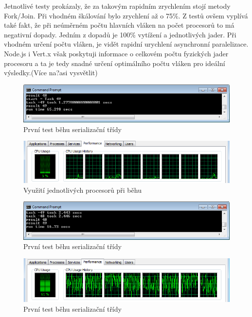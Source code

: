 Jetnotlivé testy prokázaly, že za takovým rapidním zrychlením stojí metody Fork/Join. Při vhodném škálování bylo zrychlení až o 75\%. Z testů ovšem vyplívá také fakt, že při neúměrném počtu hlavních vláken na počet procesorů to má negativní dopady. Jedním z dopadů je 100\% vytížení a jednotlivých jader. Při vhodném určení počtu vláken, je vidět rapidní urychlení asynchronní paralelizace. Node.js i Vert.x však poskytuji informace o celkovém počtu fyzických jader procesoru a ta je tedy snadné určení optimálního počtu vláken pro ideální výsledky.(Více na?asi vysvětlit)

\begin{figure}
\begin{centering}
\includegraphics[width=1\textwidth]{obrazky/serial_test_r1}
\par\end{centering}
\caption{První test běhu serializační třídy \label{fig:serialtestI}}
\end{figure}

\begin{figure}
\begin{centering}
\includegraphics[width=1\textwidth]{obrazky/serial_cpu_1}
\par\end{centering}
\caption{Využití jednotlivých procesorů při běhu \label{fig:serialCputestI}}
\end{figure}

\begin{figure}
\begin{centering}
\includegraphics[width=1\textwidth]{obrazky/executor_test_r1}
\par\end{centering}
\caption{První test běhu serializační třídy \label{fig:executorTestI}}

\end{figure}

\begin{figure}
\begin{centering}
\includegraphics[width=1\textwidth]{obrazky/executor_cpu_1}
\par\end{centering}
\caption{První test běhu serializační třídy \label{fig:executorCpuTestI}}

\end{figure}

